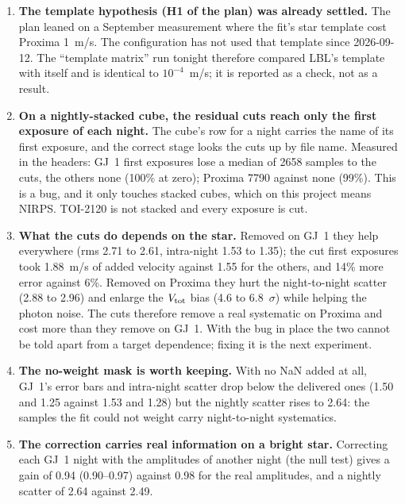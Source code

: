 \begin{enumerate}
\item \textbf{The template hypothesis (H1 of the plan) was already settled.}
  The plan leaned on a September measurement where the fit's star template cost
  Proxima 1~m/s. The configuration has not used that template since
  2026-09-12. The ``template matrix'' run tonight therefore compared LBL's
  template with itself and is identical to $10^{-4}$~m/s; it is reported as a
  check, not as a result.

\item \textbf{On a nightly-stacked cube, the residual cuts reach only the first
  exposure of each night.} The cube's row for a night carries the name of its
  first exposure, and the correct stage looks the cuts up by file name.
  Measured in the headers: GJ~1 first exposures lose a median of 2658 samples
  to the cuts, the others none (100\% at zero); Proxima 7790 against none
  (99\%). This is a bug, and it only touches stacked cubes, which on this
  project means NIRPS. TOI-2120 is not stacked and every exposure is cut.

\item \textbf{What the cuts do depends on the star.} Removed on GJ~1 they help
  everywhere (rms 2.71 to 2.61, intra-night 1.53 to 1.35); the cut first
  exposures took 1.88~m/s of added velocity against 1.55 for the others, and
  14\% more error against 6\%. Removed on Proxima they hurt the night-to-night
  scatter (2.88 to 2.96) and enlarge the $V_{\rm tot}$ bias (4.6 to
  6.8~$\sigma$) while helping the photon noise. The cuts therefore remove a
  real systematic on Proxima and cost more than they remove on GJ~1. With the
  bug in place the two cannot be told apart from a target dependence; fixing it
  is the next experiment.

\item \textbf{The no-weight mask is worth keeping.} With no NaN added at all,
  GJ~1's error bars and intra-night scatter drop below the delivered ones (1.50
  and 1.25 against 1.53 and 1.28) but the nightly scatter rises to 2.64: the
  samples the fit could not weight carry night-to-night systematics.

\item \textbf{The correction carries real information on a bright star.}
  Correcting each GJ~1 night with the amplitudes of another night (the null
  test) gives a gain of 0.94 (0.90--0.97) against 0.98 for the real
  amplitudes, and a nightly scatter of 2.64 against 2.49.


\end{enumerate}
